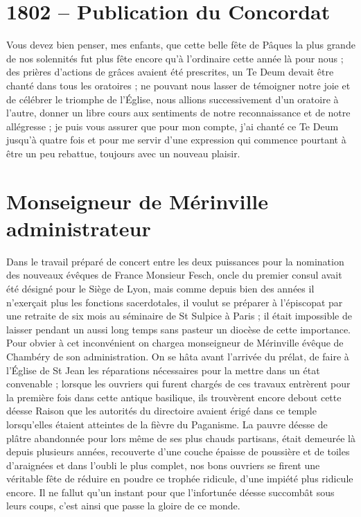 \documentclass[11pt,a4paper]{report}
\begin{document}
\section*{1802 -- Publication du Concordat}

Vous devez bien penser, mes enfants, que cette belle fête de Pâques la plus grande de nos solennités fut plus fête encore qu'à l'ordinaire cette année là pour nous ; des prières d'actions de grâces avaient été prescrites, un Te Deum devait être chanté dans tous les oratoires ; ne pouvant nous lasser de témoigner notre joie et de célébrer le triomphe de l'Église, nous allions successivement d'un oratoire à l'autre, donner un libre cours aux sentiments de notre reconnaissance et de notre allégresse ; je puis vous assurer que pour mon compte, j'ai chanté ce Te Deum jusqu'à quatre fois et pour me servir d'une expression qui commence pourtant à être un peu rebattue, toujours avec un nouveau plaisir.

\section*{Monseigneur de Mérinville administrateur}

Dans le travail préparé de concert entre les deux puissances pour la nomination des nouveaux évêques de France Monsieur Fesch, oncle du premier consul avait été désigné pour le Siège de Lyon, mais comme depuis bien des années il n'exerçait plus les fonctions sacerdotales, il voulut se préparer à l'épiscopat par une retraite de six mois au séminaire de St Sulpice à Paris ; il était impossible de laisser pendant un aussi long temps sans pasteur un diocèse de cette importance. Pour obvier à cet inconvénient on chargea monseigneur de Mérinville évêque de Chambéry de son administration. On se hâta avant l'arrivée du prélat, de faire à l'Église de St Jean les réparations nécessaires pour la mettre dans un état convenable ; lorsque les ouvriers qui furent chargés de ces travaux entrèrent pour la première fois dans cette antique basilique, ils trouvèrent encore debout cette déesse Raison que les autorités du directoire avaient érigé dans ce temple lorsqu'elles étaient atteintes de la fièvre du Paganisme. La pauvre déesse de plâtre abandonnée pour lors même de ses plus chauds partisans, était demeurée là depuis plusieurs années, recouverte d'une couche épaisse de poussière et de toiles d'araignées et dans l'oubli le plus complet, nos bons ouvriers se firent une véritable fête de réduire en poudre ce trophée ridicule, d'une impiété plus ridicule encore. Il ne fallut qu'un instant pour que l'infortunée déesse succombât sous leurs coups, c'est ainsi que passe la gloire de ce monde.
\end{document}
